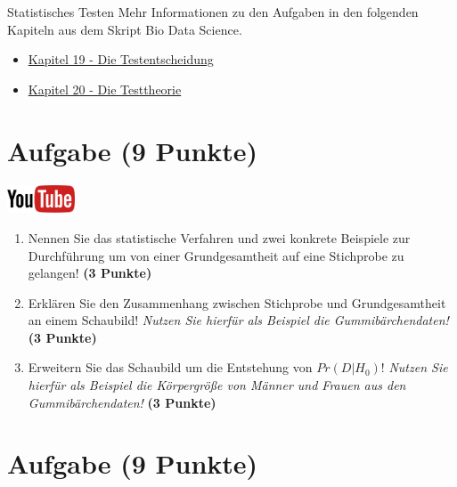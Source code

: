 \documentclass[a4paper, 9pt]{scrartcl}\usepackage[]{graphicx}\usepackage[]{xcolor}
\begin{document}
 
\clearpage
\begin{graybox}{Statistisches Testen}
Mehr Informationen zu den Aufgaben in den folgenden Kapiteln aus dem Skript Bio Data Science.
  \begin{itemize}
  \item \href{https://jkruppa.github.io/stat-tests-basic.html}{Kapitel 19 - Die Testentscheidung}
  \item \href{https://jkruppa.github.io/stat-tests-theorie.html}{Kapitel 20 - Die Testtheorie}
  \end{itemize}
\end{graybox}
\clearpage

\section{Aufgabe \hfill (9 Punkte)}

\hfill\href{https://youtu.be/1S-FuQisTpE}{\includegraphics[width =
  2cm]{img/youtube}}\\[1Ex]

\begin{enumerate}
\item Nennen Sie das statistische Verfahren und zwei konkrete Beispiele zur
  Durchf{\"u}hrung um von einer Grundgesamtheit auf eine Stichprobe zu
  gelangen! \textbf{(3 Punkte)}
\item Erkl{\"a}ren Sie den Zusammenhang zwischen Stichprobe und Grundgesamtheit
  an einem Schaubild! \textit{Nutzen Sie hierf{\"u}r als Beispiel die Gummib{\"a}rchendaten!} \textbf{(3 Punkte)}
\item Erweitern Sie das Schaubild um die Entstehung von $Pr(D|H_0)$!
  \textit{Nutzen Sie hierf{\"u}r als Beispiel die K{\"o}rpergr{\"o}{\ss}e von M{\"a}nner und
    Frauen aus den Gummib{\"a}rchendaten!}
  \textbf{(3 Punkte)}
\end{enumerate} 
\clearpage

\section{Aufgabe \hfill (9 Punkte)}
\end{document}
